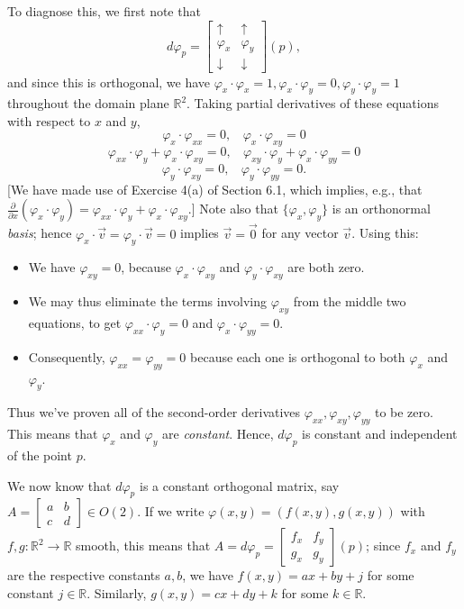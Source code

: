 \documentclass[leqno]{book}
\begin{document}
To diagnose this, we first note that
$$d\varphi_p=\begin{bmatrix}\uparrow&\uparrow\\\varphi_x&\varphi_y\\\downarrow&\downarrow\end{bmatrix}(p),$$
and since this is orthogonal, we have $\varphi_x\cdot\varphi_x=1,\varphi_x\cdot\varphi_y=0,\varphi_y\cdot\varphi_y=1$ throughout the domain plane $\mathbb R^2$.  Taking partial derivatives of these equations with respect to $x$ and $y$,
$$\varphi_x\cdot\varphi_{xx}=0,~~~~\varphi_x\cdot\varphi_{xy}=0$$
$$\varphi_{xx}\cdot\varphi_y+\varphi_x\cdot\varphi_{xy}=0,~~~~\varphi_{xy}\cdot\varphi_y+\varphi_x\cdot\varphi_{yy}=0$$
$$\varphi_y\cdot\varphi_{xy}=0,~~~~\varphi_y\cdot\varphi_{yy}=0.$$
[We have made use of Exercise 4(a) of Section 6.1, which implies, e.g., that $\frac{\partial}{\partial x}(\varphi_x\cdot\varphi_y)=\varphi_{xx}\cdot\varphi_y+\varphi_x\cdot\varphi_{xy}$.]  Note also that $\{\varphi_x,\varphi_y\}$ is an orthonormal \emph{basis}; hence $\varphi_x\cdot\vec v=\varphi_y\cdot\vec v=0$ implies $\vec v=\vec 0$ for any vector $\vec v$.  Using this:
\begin{itemize}
\item We have $\varphi_{xy}=0$, because $\varphi_x\cdot\varphi_{xy}$ and $\varphi_y\cdot\varphi_{xy}$ are both zero.

\item We may thus eliminate the terms involving $\varphi_{xy}$ from the middle two equations, to get $\varphi_{xx}\cdot\varphi_y=0$ and $\varphi_x\cdot\varphi_{yy}=0$.

\item Consequently, $\varphi_{xx}=\varphi_{yy}=0$ because each one is orthogonal to both $\varphi_x$ and $\varphi_y$.
\end{itemize}
Thus we've proven all of the second-order derivatives $\varphi_{xx},\varphi_{xy},\varphi_{yy}$ to be zero.  This means that $\varphi_x$ and $\varphi_y$ are \emph{constant}.  Hence, $d\varphi_p$ is constant and independent of the point $p$.

We now know that $d\varphi_p$ is a constant orthogonal matrix, say $A=\begin{bmatrix}a&b\\c&d\end{bmatrix}\in O(2)$.  If we write $\varphi(x,y)=(f(x,y),g(x,y))$ with $f,g:\mathbb R^2\to\mathbb R$ smooth, this means that $A=d\varphi_p=\begin{bmatrix}f_x&f_y\\g_x&g_y\end{bmatrix}(p)$; since $f_x$ and $f_y$ are the respective constants $a,b$, we have $f(x,y)=ax+by+j$ for some constant $j\in\mathbb R$.  Similarly, $g(x,y)=cx+dy+k$ for some $k\in\mathbb R$.
\end{document}
